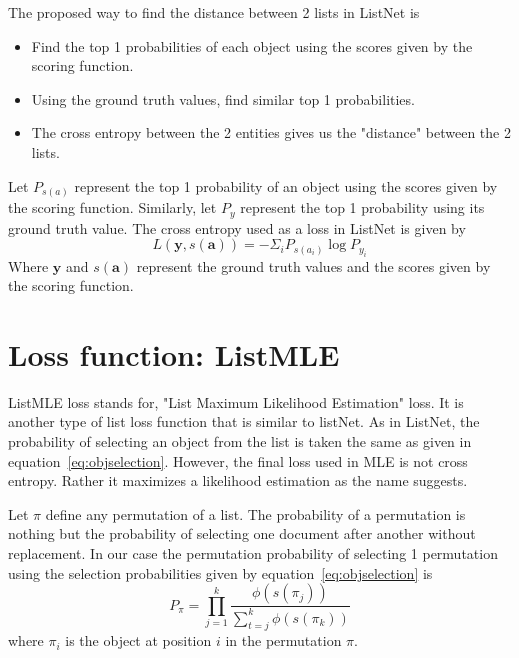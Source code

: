 \documentclass[12pt, twoside, ngerman]{report}
\begin{document}
The proposed way to find the distance between 2 lists in ListNet is
\begin{itemize}
\item Find the top 1 probabilities of each object using the scores given by the scoring function.
\item Using the ground truth values,  find similar top 1 probabilities.
\item The cross entropy between the 2 entities gives us the "distance" between the 2 lists.
\end{itemize}

Let $P_{s(a)}$ represent the top 1 probability of an object using the scores given by the scoring function.
Similarly,   let $P_y$ represent the top 1 probability using its ground truth value.
The cross entropy used as a loss in ListNet is given by
\begin{equation}
L(\textbf{y},  {s(\textbf{a})}) = - \Sigma_i P_{s(a_i)} \log P_{y_i}
\end{equation}
Where $\textbf{y}$ and $s(\textbf{a})$ represent the ground truth values and the scores given by the scoring function.

\section{Loss function: ListMLE}\label{sec:listMLE}

ListMLE loss stands for, "List Maximum Likelihood Estimation" loss.
It is another type of list loss function that is similar to listNet.
As in ListNet,  the probability of selecting an object from the list is taken the same as given in equation~\ref{eq:objselection}.
However,  the final loss used in MLE is not cross entropy.
Rather it maximizes a likelihood estimation as the name suggests.

Let $\pi$ define any permutation of a list.
The probability of a permutation is nothing but the probability of selecting one document after another without replacement.
In our case the permutation probability of selecting 1 permutation using the selection probabilities given by equation~\ref{eq:objselection}  is~\cite{listwisebetter}
\begin{equation}\label{eq:firstMLEequation}
P_{\pi} = \prod\limits_{j=1}^{k} \frac{\phi(s(\pi_j))}{ \sum\limits_{t=j}^k \phi(s(\pi_k))}
\end{equation}
where $\pi_i$ is the object at position $i$ in the permutation $\pi$.
\end{document}
